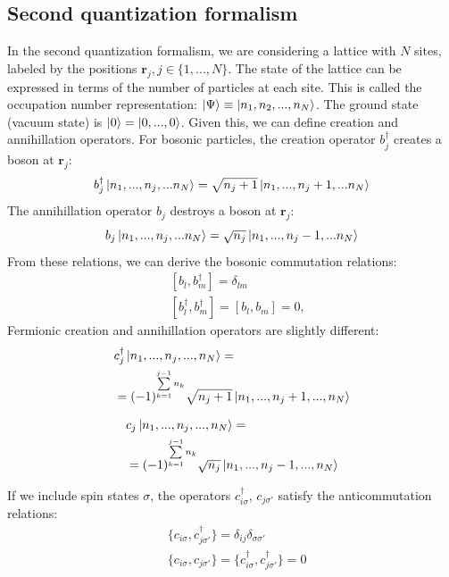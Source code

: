 \documentclass[11pt, a4paper, twocolumn]{article}
\newcommand{\bb}[1]{\mathbf{#1}}
\begin{document}
\subsection*{Second quantization formalism}
In the second quantization formalism, we are considering a lattice with $N$ sites, labeled by the positions
$\bb r_j, j \in \{1,...,N\}$. The state of the lattice can be expressed in terms of the number of particles at each site.
This is called the occupation number representation: $\ket\Psi\equiv \ket{n_1,n_2,...,n_N}$. The ground state (vacuum state) is
$\ket 0 = \ket{0,...,0}$. Given this, we can define creation and annihillation operators. For bosonic particles, the creation
operator $b^\dagger_j$ creates a boson at $\bb r_j$:
\begin{equation*}
  b^\dagger_j\ket{n_1,...,n_j,...n_N} = \sqrt{n_j+1}\ket{n_1,...,n_j+1,...n_N}
\end{equation*}
The annihillation operator $b_j$ destroys a boson at $\bb r_j$:
\begin{equation*}
  b_j\ket{n_1,...,n_j,...n_N} = \sqrt{n_j}\ket{n_1,...,n_j-1,...n_N}
\end{equation*}
From these relations, we can derive the bosonic commutation relations:
\begin{align*}
  &[b_l, b^\dagger_m] = \delta_{lm} \\
  &[b^\dagger_l, b^\dagger_m] = [b_l,b_m]=0 \textrm{,}
\end{align*}
Fermionic creation and annihillation operators are slightly different:
\begin{align*}
  &c^\dagger_j\ket{n_1,...,n_j,...,n_N} = \\
  &= (-1)^{\sum\limits_{k=1}^{j-1} n_k}\sqrt{n_j+1}\ket{n_1,...,n_j+1,...,n_N}
\end{align*}

\begin{align*}
  &c_j \ket{n_1,...,n_j,...,n_N} = \\
  &=(-1)^{\sum\limits_{k=1}^{j-1} n_k}\sqrt{n_j}\ket{n_1,...,n_j-1,...,n_N}
\end{align*}

If we include spin states $\sigma$, the operators $c^\dagger_{i\sigma}$, $c_{j\sigma'}$ satisfy the anticommutation
relations:
\begin{align*}
  &\{ c_{i\sigma}, c^\dagger_{j\sigma'} \} = \delta_{ij}\delta_{\sigma\sigma'} \\
  &\{ c_{i\sigma}, c_{j\sigma'} \} = \{ c^\dagger_{i\sigma}, c^\dagger_{j\sigma'} \} = 0
\end{align*}
\end{document}
